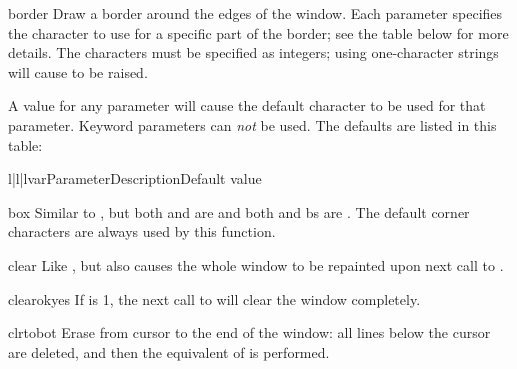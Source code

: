 \begin{methoddesc}{border}{}
Draw a border around the edges of the window. Each parameter specifies 
the character to use for a specific part of the border; see the table
below for more details.  The characters must be specified as integers;
using one-character strings will cause  to be
raised.

 A  value for any parameter will cause the
default character to be used for that parameter.  Keyword parameters
can \emph{not} be used.  The defaults are listed in this table:

\begin{tableiii}{l|l|l}{var}{Parameter}{Description}{Default value}
\end{tableiii}
\end{methoddesc}

\begin{methoddesc}{box}{}
Similar to , but both  and  are
 and both  and {bs} are .  The default
corner characters are always used by this function.
\end{methoddesc}

\begin{methoddesc}{clear}{}
Like , but also causes the whole window to be repainted
upon next call to .
\end{methoddesc}

\begin{methoddesc}{clearok}{yes}
If  is 1, the next call to 
will clear the window completely.
\end{methoddesc}

\begin{methoddesc}{clrtobot}{}
Erase from cursor to the end of the window: all lines below the cursor
are deleted, and then the equivalent of  is performed.
\end{methoddesc}

